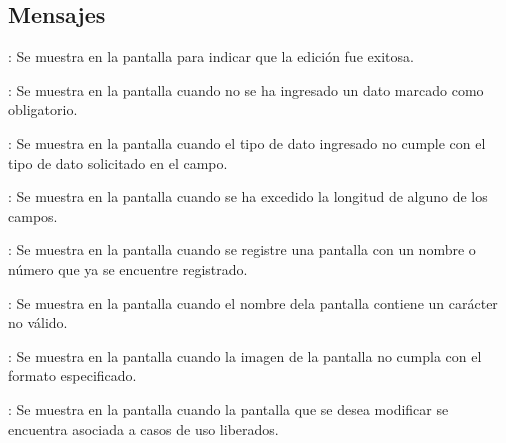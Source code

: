 \subsection{Mensajes}

\begin{Citemize}
	\item {}: Se muestra en la pantalla  para indicar que la edición fue exitosa.
	\item {}: Se muestra en la pantalla  cuando no se ha ingresado un dato marcado como obligatorio.
	\item {}: Se muestra en la pantalla  cuando el tipo de dato ingresado no cumple con el tipo de dato solicitado en el campo.
	\item {}: Se muestra en la pantalla  cuando se ha excedido la longitud de alguno de los campos.
	\item {}: Se muestra en la pantalla  cuando se registre una pantalla con un nombre o número que ya se encuentre registrado.
	\item {}: Se muestra en la pantalla  cuando el nombre dela pantalla contiene un carácter no válido.
	\item {}: Se muestra en la pantalla  cuando la imagen de la pantalla no cumpla con el formato especificado.
	\item {}: Se muestra en la pantalla  cuando la pantalla que se desea modificar se encuentra asociada a casos de uso liberados.
\end{Citemize}
